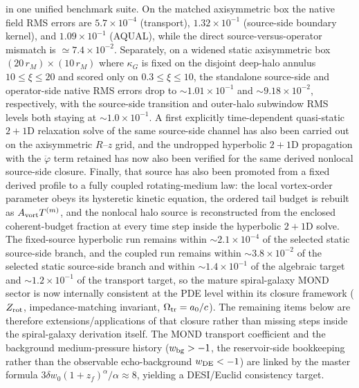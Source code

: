 \documentclass[aps,prd,onecolumn,superscriptaddress,nofootinbib,showpacs,12pt]{revtex4-2}
\begin{document}
\begin{enumerate}
  in one unified benchmark suite.  On the matched
  axisymmetric box the native field RMS errors are
  $5.7\times10^{-4}$ (transport), $1.32\times10^{-1}$
  (source-side boundary kernel), and $1.09\times10^{-1}$
  (AQUAL), while the direct source-versus-operator mismatch
  is $\simeq7.4\times10^{-2}$.  Separately, on a widened
  static axisymmetric box $(20\,r_M)\times(10\,r_M)$ where
  $\kappa_G$ is fixed on the disjoint deep-halo annulus
  $10\le\xi\le20$ and scored only on $0.3\le\xi\le10$,
  the standalone source-side and operator-side native RMS
  errors drop to $\sim1.01\times10^{-1}$ and
  $\sim9.18\times10^{-2}$, respectively, with the
  source-side transition and outer-halo subwindow RMS levels
  both staying at $\sim1.0\times10^{-1}$.  A first explicitly
  time-dependent quasi-static $2+1$D relaxation solve of
  the same source-side channel has also been carried out
  on the axisymmetric $R$--$z$ grid, and the undropped
  hyperbolic $2+1$D propagation with the $\ddot{\varphi}$
  term retained has now also been verified for the same
  derived nonlocal source-side closure.  Finally, that
  source has also been promoted from a fixed derived profile
  to a fully coupled rotating-medium law: the local
  vortex-order parameter obeys its hysteretic kinetic
  equation, the ordered tail budget is rebuilt as
  $A_{\rm vort}T^{(m)}$, and the nonlocal halo source is
  reconstructed from the enclosed coherent-budget fraction
  at every time step inside the hyperbolic $2+1$D solve.
  The fixed-source hyperbolic run remains within
  $\sim2.1\times10^{-4}$ of the selected static source-side
  branch, and the coupled run remains within
  $\sim3.8\times10^{-2}$ of
  the selected static source-side branch and within
  $\sim1.4\times10^{-1}$ of the algebraic target and
  $\sim1.2\times10^{-1}$ of the transport target, so the
  mature spiral-galaxy MOND sector is now internally consistent
  at the PDE level within its closure framework
  ($Z_{\rm rot}$, impedance-matching invariant, $\Omega_{\rm tr}=a_0/c$).
  The remaining items below are therefore
  extensions/applications of that closure rather
  than missing steps inside the spiral-galaxy derivation
  itself.
  The MOND transport
  coefficient and the background medium-pressure history
  ($w_{\rm bg} > -1$, the reservoir-side bookkeeping rather
  than the observable echo-background $w_{\rm DE}< -1$)
  are linked by the master formula
  $3\delta w_0(1+z_f)^\alpha/\alpha\approx 8$,
  yielding a DESI/Euclid consistency target.


\end{enumerate}
\end{document}
